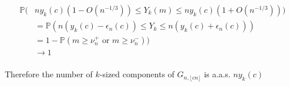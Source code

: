 
\begin{align*}
    \mathbb{P}(&ny_{k}(c)(1 - O(n^{-1/3})) \leq  Y_{k}(m) \leq ny_{k}(c)(1 + O(n^{-1/3}))) \\
    &= \mathbb{P}(n(y_{k}(c) - \epsilon_{n}(c)) \leq  Y_{k} \leq n(y_{k}(c) + \epsilon_{n}(c))) \\
    &= 1 - \mathbb{P}(m \geq \nu_{n}^{+} \text{ or } m \geq \nu_{n}^{-})) \\
    &\to  1\\
\end{align*}

Therefore the number of \(k\)-sized components of \(G_{n, \lfloor {cn} \rfloor}\) is a.a.s. \(ny_{k}(c)\)





